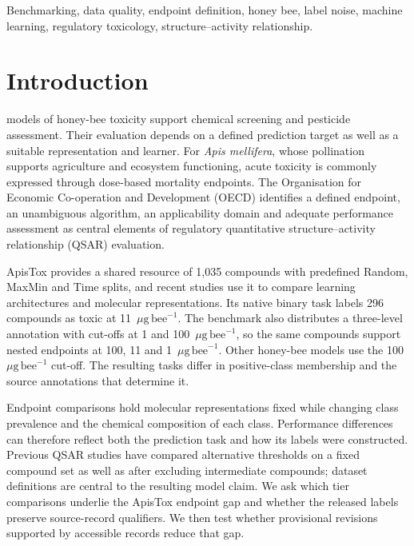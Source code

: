 \documentclass{ieeeaccess}
\newcommand{\ugbee}{\ensuremath{\mu\mathrm{g\,bee}^{-1}}\xspace}
\begin{document}
\begin{keywords}
Benchmarking, data quality, endpoint definition, honey bee, label noise, machine learning, regulatory toxicology, structure--activity relationship.
\end{keywords}

\titlepgskip=-21pt

\maketitle

\section{Introduction}
\label{sec:introduction}
 models of honey-bee toxicity support chemical screening and pesticide assessment. Their evaluation depends on a defined prediction target as well as a suitable representation and learner. For \textit{Apis mellifera}, whose pollination supports agriculture and ecosystem functioning\cite{Patel2021}, acute toxicity is commonly expressed through dose-based mortality endpoints. The Organisation for Economic Co-operation and Development (OECD) identifies a defined endpoint, an unambiguous algorithm, an applicability domain and adequate performance assessment as central elements of regulatory quantitative structure--activity relationship (QSAR) evaluation\cite{OECD2014,OECD2023}.

ApisTox provides a shared resource of 1,035 compounds with predefined Random, MaxMin and Time splits\cite{Adamczyk2025}, and recent studies use it to compare learning architectures and molecular representations\cite{Adamczyk2026,Damiao2025,Pinho2026,Adamczyk2025b}. Its native binary task labels 296 compounds as toxic at 11~\ugbee. The benchmark also distributes a three-level annotation with cut-offs at 1 and 100~\ugbee, so the same compounds support nested endpoints at 100, 11 and 1~\ugbee. Other honey-bee models use the 100~\ugbee cut-off\cite{Iovine2026}. The resulting tasks differ in positive-class membership and the source annotations that determine it.

Endpoint comparisons hold molecular representations fixed while changing class prevalence and the chemical composition of each class. Performance differences can therefore reflect both the prediction task and how its labels were constructed. Previous QSAR studies have compared alternative thresholds on a fixed compound set as well as after excluding intermediate compounds\cite{Wang2023}; dataset definitions are central to the resulting model claim\cite{Nael2026}. We ask which tier comparisons underlie the ApisTox endpoint gap and whether the released labels preserve source-record qualifiers. We then test whether provisional revisions supported by accessible records reduce that gap.
\end{document}
